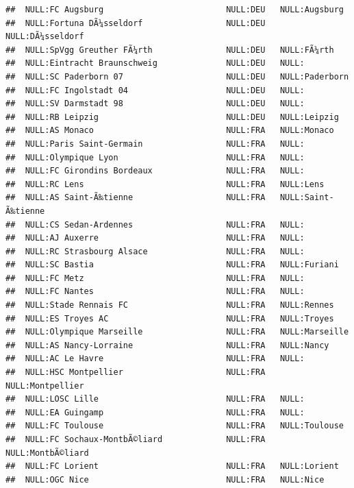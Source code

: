 \documentclass{article}\usepackage[]{graphicx}\usepackage[]{color}
\makeatletter
\newenvironment{kframe}{%
 \def\at@end@of@kframe{}%
 \ifinner\ifhmode%
  \def\at@end@of@kframe{\end{minipage}}%
  \begin{minipage}{\columnwidth}%
 \fi\fi%
 \def\FrameCommand##1{\hskip\@totalleftmargin \hskip-\fboxsep
 \colorbox{shadecolor}{##1}\hskip-\fboxsep
     \hskip-\linewidth \hskip-\@totalleftmargin \hskip\columnwidth}%
 \MakeFramed {\advance\hsize-\width
   \@totalleftmargin\z@ \linewidth\hsize
   \@setminipage}}%
 {\par\unskip\endMakeFramed%
 \at@end@of@kframe}
\newenvironment{knitrout}{}{} %
\makeatother
\begin{document}
\begin{knitrout}
\begin{kframe}
\begin{verbatim}
##  NULL:FC Augsburg                         NULL:DEU   NULL:Augsburg             
##  NULL:Fortuna DÃ¼sseldorf                 NULL:DEU   NULL:DÃ¼sseldorf          
##  NULL:SpVgg Greuther FÃ¼rth               NULL:DEU   NULL:FÃ¼rth               
##  NULL:Eintracht Braunschweig              NULL:DEU   NULL:                     
##  NULL:SC Paderborn 07                     NULL:DEU   NULL:Paderborn            
##  NULL:FC Ingolstadt 04                    NULL:DEU   NULL:                     
##  NULL:SV Darmstadt 98                     NULL:DEU   NULL:                     
##  NULL:RB Leipzig                          NULL:DEU   NULL:Leipzig              
##  NULL:AS Monaco                           NULL:FRA   NULL:Monaco               
##  NULL:Paris Saint-Germain                 NULL:FRA   NULL:                     
##  NULL:Olympique Lyon                      NULL:FRA   NULL:                     
##  NULL:FC Girondins Bordeaux               NULL:FRA   NULL:                     
##  NULL:RC Lens                             NULL:FRA   NULL:Lens                 
##  NULL:AS Saint-Ã‰tienne                   NULL:FRA   NULL:Saint-Ã‰tienne       
##  NULL:CS Sedan-Ardennes                   NULL:FRA   NULL:                     
##  NULL:AJ Auxerre                          NULL:FRA   NULL:                     
##  NULL:RC Strasbourg Alsace                NULL:FRA   NULL:                     
##  NULL:SC Bastia                           NULL:FRA   NULL:Furiani              
##  NULL:FC Metz                             NULL:FRA   NULL:                     
##  NULL:FC Nantes                           NULL:FRA   NULL:                     
##  NULL:Stade Rennais FC                    NULL:FRA   NULL:Rennes               
##  NULL:ES Troyes AC                        NULL:FRA   NULL:Troyes               
##  NULL:Olympique Marseille                 NULL:FRA   NULL:Marseille            
##  NULL:AS Nancy-Lorraine                   NULL:FRA   NULL:Nancy                
##  NULL:AC Le Havre                         NULL:FRA   NULL:                     
##  NULL:HSC Montpellier                     NULL:FRA   NULL:Montpellier          
##  NULL:LOSC Lille                          NULL:FRA   NULL:                     
##  NULL:EA Guingamp                         NULL:FRA   NULL:                     
##  NULL:FC Toulouse                         NULL:FRA   NULL:Toulouse             
##  NULL:FC Sochaux-MontbÃ©liard             NULL:FRA   NULL:MontbÃ©liard         
##  NULL:FC Lorient                          NULL:FRA   NULL:Lorient              
##  NULL:OGC Nice                            NULL:FRA   NULL:Nice                 

\end{verbatim}
\end{kframe}
\end{knitrout}
\end{document}
